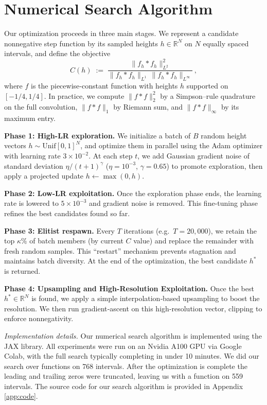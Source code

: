\documentclass[11pt]{article}
\theoremstyle{definition}
\theoremstyle{remark}
\newcommand{\R}{\mathbb{R}}
\begin{document}
\section{Numerical Search Algorithm}

Our optimization proceeds in three main stages. We represent a candidate nonnegative step function by its sampled heights \(h\in\R^{N}\) on \(N\) equally spaced intervals, and define the objective
\begin{equation}\label{eq:Cdef}
  C(h)
  \;:=\;
  \frac{\|f_{h} * f_{h}\|_{L^{2}}^{2}}
       {\|f_{h} * f_{h}\|_{L^{1}}
        \,\|f_{h} * f_{h}\|_{L^{\infty}}}\,,
\end{equation}
where \(f\) is the piecewise‐constant function with heights \(h\) supported on \([-1/4,1/4]\).  In practice, we compute \(\|f*f\|_{2}^{2}\) by a Simpson–rule quadrature on the full convolution, \(\|f*f\|_{1}\) by Riemann sum, and \(\|f*f\|_{\infty}\) by its maximum entry. 

\medskip\noindent\textbf{Phase 1: High-LR exploration.}  We initialize a batch of \(B\) random height vectors \(h\sim\mathrm{Unif}[0,1]^{N}\), and optimize them in parallel using the Adam optimizer with learning rate \(3\times10^{-2}\).  At each step \(t\), we add Gaussian gradient noise of standard deviation \(\eta/(t+1)^{\gamma}\) (\(\eta=10^{-3}\), \(\gamma=0.65\)) to promote exploration, then apply a projected update \(h\gets\max(0,h)\).

\medskip\noindent\textbf{Phase 2: Low-LR exploitation.}  Once the exploration phase ends, the learning rate is lowered to \(5\times10^{-3}\) and gradient noise is removed. This fine-tuning phase refines the best candidates found so far.

\medskip\noindent\textbf{Phase 3: Elitist respawn.}  Every \(T\) iterations (e.g.\ \(T=20{,}000\)), we retain the top \(\kappa\%\) of batch members (by current \(C\) value) and replace the remainder with fresh random samples.  This “restart” mechanism prevents stagnation and maintains batch diversity. At the end of the optimization, the best candidate \(h^{*}\) is returned.

\medskip\noindent\textbf{Phase 4: Upsampling and High-Resolution Exploitation.}
Once the best $h^{*}\in\R^{N}$ is found, we apply a simple interpolation‐based upsampling to boost the resolution. We then run gradient‐ascent on this high‐resolution vector, clipping to enforce nonnegativity.

\medskip\noindent\emph{Implementation details.} Our numerical search algorithm is implemented using the JAX library. All experiments were run on an Nvidia A100 GPU via Google Colab, with the full search typically completing in under 10 minutes. We did our search over functions on 768 intervals. After the optimization is complete the leading and trailing zeros were truncated, leaving us with a function on 559 intervals. The source code for our search algorithm is provided in Appendix \ref{app:code}.
\end{document}
